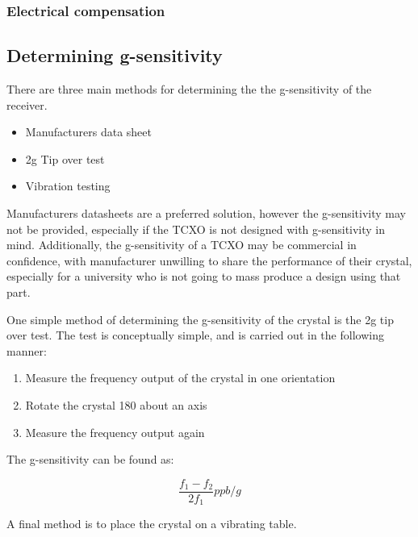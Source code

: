 \subsubsection{Electrical compensation}

\subsection{Determining g-sensitivity}
There are three main methods for determining the the g-sensitivity of the receiver.

\begin{itemize}
\item{Manufacturers data sheet}
\item{2g Tip over test}
\item{Vibration testing}
\end{itemize}

Manufacturers datasheets are a preferred solution, however the g-sensitivity may not be provided, especially if the \ac{TCXO} is not designed with g-sensitivity in mind. Additionally,  the g-sensitivity of a \ac{TCXO} may be commercial in confidence, with manufacturer unwilling to share the performance of their crystal, especially for a university who is not going to mass produce a design using that part. 

One simple method of determining the g-sensitivity of the crystal is the 2g tip over test. The test is conceptually simple, and is carried out in the following manner:

\begin{enumerate}
\item{Measure the frequency output of the crystal in one orientation}
\item{Rotate the crystal 180 \degree about an axis}
\item{Measure the frequency output again}

\end{enumerate}

 The g-sensitivity can be found as:

\begin{equation}
\frac{f_1-f_2}{2 f_1} ppb/g
\end{equation}

A final method is to place the crystal on a vibrating table. 

